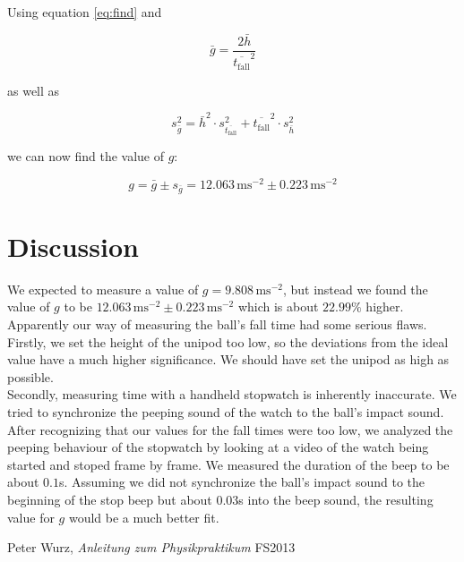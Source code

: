 \documentclass{scrreprt}
\newcommand{\unit}[1]{\ensuremath{\, \mathrm{#1}}}
\begin{document}
Using equation \ref{eq:find} and 

\begin{equation}
\bar{g} = \frac{2 \bar{h}}{\overline{t_{\text{fall}}}^2}
\end{equation}

as well as 

\begin{equation}
s_{\bar{g}}^2 = \bar{h}^2 \cdot s_{\overline{t_{\text{fall}}}}^2 + \overline{t_{\text{fall}}}^2 \cdot s_{\bar{h}}^2
\end{equation}

we can now find the value of $g$:

\begin{equation}
g = \bar{g} \pm s_{\bar{g}} = 12.063\unit{m s^{-2}} \pm 0.223\unit{m s^{-2}}
\end{equation}

\section{Discussion}
We expected to measure a value of $g = 9.808\unit{ms^{-2}}$, but instead we found the value of $g$ to be $12.063\unit{m s^{-2}} \pm 0.223\unit{m s^{-2}}$ which is about $22.99\%$ higher.\\
Apparently our way of measuring the ball's fall time had some serious flaws.\\
Firstly, we set the height of the unipod too low, so the deviations from the ideal value have a much higher significance. We should have set the unipod as high as possible.\\
Secondly, measuring time with a handheld stopwatch is inherently inaccurate. We tried to synchronize the peeping sound of the watch to the ball's impact sound. After recognizing that our values for the fall times were too low, we analyzed the peeping behaviour of the stopwatch by looking at a video of the watch being started and stoped frame by frame. We measured the duration of the beep to be about $0.1$s. Assuming we did not synchronize the ball's impact sound to the beginning of the stop beep but about $0.03$s into the beep sound, the resulting value for $g$ would be a much better fit.

\begin{thebibliography}{9}

  Peter Wurz,
  \emph{Anleitung zum Physikpraktikum}
  FS2013

\end{thebibliography}
\end{document}
